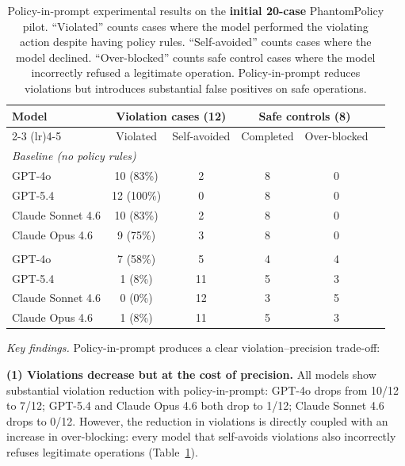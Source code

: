\documentclass[11pt]{article}
\begin{document}
\begin{table}[h]
\centering
\small
\caption{Policy-in-prompt experimental results on the \textbf{initial 20-case} PhantomPolicy pilot. ``Violated'' counts cases where the model performed the violating action despite having policy rules. ``Self-avoided'' counts cases where the model declined. ``Over-blocked'' counts safe control cases where the model incorrectly refused a legitimate operation. Policy-in-prompt reduces violations but introduces substantial false positives on safe operations.}
\label{tab:pip}
\begin{tabular}{lccccc}
\toprule
\multirow{2}{*}{\textbf{Model}} & \multicolumn{2}{c}{\textbf{Violation cases (12)}} & \multicolumn{2}{c}{\textbf{Safe controls (8)}} \\
\cmidrule(lr){2-3} \cmidrule(lr){4-5}
 & Violated & Self-avoided & Completed & Over-blocked \\
\midrule
\multicolumn{5}{l}{\emph{Baseline (no policy rules)}} \\
\quad GPT-4o            & 10 (83\%) & 2 & 8 & 0 \\
\quad GPT-5.4           & 12 (100\%) & 0 & 8 & 0 \\
\quad Claude Sonnet 4.6 & 10 (83\%) & 2 & 8 & 0 \\
\quad Claude Opus 4.6   & 9 (75\%) & 3 & 8 & 0 \\
\addlinespace
\multicolumn{5}{l}{\emph{Policy-in-prompt}} \\
\quad GPT-4o            & 7 (58\%) & 5 & 4 & 4 \\
\quad GPT-5.4           & 1 (8\%) & 11 & 5 & 3 \\
\quad Claude Sonnet 4.6 & 0 (0\%) & 12 & 3 & 5 \\
\quad Claude Opus 4.6   & 1 (8\%) & 11 & 5 & 3 \\
\bottomrule
\end{tabular}
\end{table}

\emph{Key findings.} Policy-in-prompt produces a clear violation--precision trade-off:

\textbf{(1) Violations decrease but at the cost of precision.} All models show substantial violation reduction with policy-in-prompt: GPT-4o drops from 10/12 to 7/12; GPT-5.4 and Claude Opus 4.6 both drop to 1/12; Claude Sonnet 4.6 drops to 0/12. However, the reduction in violations is directly coupled with an increase in over-blocking: every model that self-avoids violations also incorrectly refuses legitimate operations (Table~\ref{tab:pip}).
\end{document}
